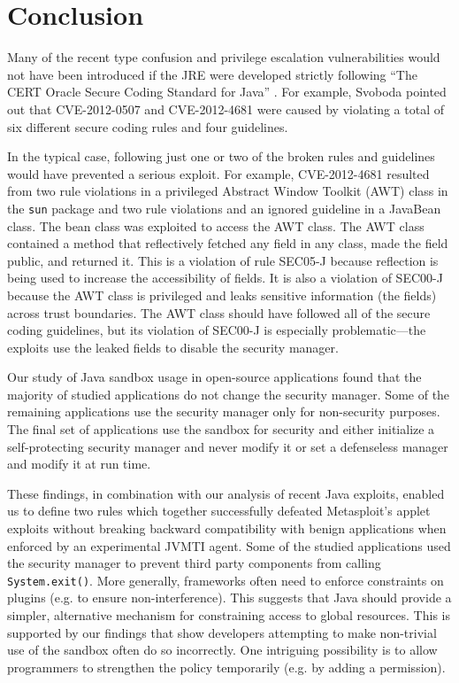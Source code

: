 \documentclass{sig-alternate}
\begin{document}
\section{Conclusion}

Many of the recent type confusion and privilege escalation vulnerabilities
would not have been introduced if the JRE were developed strictly
following ``The CERT Oracle Secure Coding Standard for Java'' \cite{long_cert_2011}.
For example, Svoboda \cite{svoboda_anatomy_blog_2013,svoboda_anatomy_2014}
pointed out that CVE-2012-0507 and CVE-2012-4681 were caused by violating
a total of six different secure coding rules and four guidelines. 

In the typical case, following just one or two of the broken rules
and guidelines would have prevented a serious exploit. For example,
CVE-2012-4681 resulted from two rule violations in a privileged Abstract
Window Toolkit (AWT) class in the \texttt{sun} package and two rule
violations and an ignored guideline in a JavaBean class. The bean
class was exploited to access the AWT class. The AWT class contained
a method that reflectively fetched any field in any class, made the
field public, and returned it. This is a violation of rule SEC05-J
because reflection is being used to increase the accessibility of
fields. It is also a violation of SEC00-J because the AWT class is
privileged and leaks sensitive information (the fields) across trust
boundaries. The AWT class should have followed all of the secure coding
guidelines, but its violation of SEC00-J is especially problematic---the
exploits use the leaked fields to disable the security manager. 


Our study of Java sandbox usage in open-source applications found
that the majority of studied applications do not change the security
manager. Some of the remaining applications use the security manager
only for non-security purposes. The final set of applications use
the sandbox for security and either initialize a self-protecting security
manager and never modify it or set a defenseless manager and modify
it at run time. 

These findings, in combination with our analysis of recent Java exploits,
enabled us to define two rules which together successfully
defeated Metasploit's applet exploits without breaking backward compatibility with benign applications when enforced by an experimental JVMTI agent. Some of the studied applications
used the security manager to prevent third party components from calling
\texttt{System.exit()}. More generally, frameworks often need to enforce
constraints on plugins (e.g. to ensure non-interference). This suggests
that Java should provide a simpler, alternative mechanism for constraining
access to global resources. This is supported by our findings that
show developers attempting to make non-trivial use of the sandbox
often do so incorrectly. One intriguing possibility is to allow programmers
to strengthen the policy temporarily (e.g. by adding a permission). 
\end{document}
